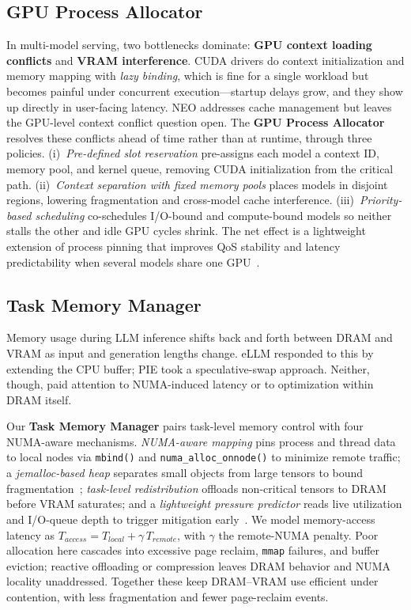 \subsection{GPU Process Allocator}
In multi-model serving, two bottlenecks dominate: \textbf{GPU context loading conflicts} and \textbf{VRAM interference}. CUDA drivers do context initialization and memory mapping with \textit{lazy binding}, which is fine for a single workload but becomes painful under concurrent execution---startup delays grow, and they show up directly in user-facing latency. NEO \cite{jiang2024neo} addresses cache management but leaves the GPU-level context conflict question open.
The \textbf{GPU Process Allocator} resolves these conflicts ahead of time rather than at runtime, through three policies. (i)~\emph{Pre-defined slot reservation} pre-assigns each model a context ID, memory pool, and kernel queue, removing CUDA initialization from the critical path. (ii)~\emph{Context separation with fixed memory pools} places models in disjoint regions, lowering fragmentation and cross-model cache interference. (iii)~\emph{Priority-based scheduling} co-schedules I/O-bound and compute-bound models so neither stalls the other and idle GPU cycles shrink. The net effect is a lightweight extension of process pinning that improves QoS stability and latency predictability when several models share one GPU~\cite{stojkovic2025dynamollm}.



\subsection{Task Memory Manager}
Memory usage during LLM inference shifts back and forth between DRAM and VRAM as input and generation lengths change. eLLM \cite{xu2025ellm} responded to this by extending the CPU buffer; PIE \cite{xu2024pie} took a speculative-swap approach. Neither, though, paid attention to NUMA-induced latency or to optimization within DRAM itself.

Our \textbf{Task Memory Manager} pairs task-level memory control with four NUMA-aware mechanisms. \emph{NUMA-aware mapping} pins process and thread data to local nodes via \texttt{mbind()} and \texttt{numa\_alloc\_onnode()} to minimize remote traffic; a \emph{jemalloc-based heap} separates small objects from large tensors to bound fragmentation~\cite{hunter2021hugepage,yang2023numalloc}; \emph{task-level redistribution} offloads non-critical tensors to DRAM before VRAM saturates; and a \emph{lightweight pressure predictor} reads live utilization and I/O-queue depth to trigger mitigation early~\cite{korthikanti2023reducing}. We model memory-access latency as $T_{access}=T_{local}+\gamma\,T_{remote}$, with $\gamma$ the remote-NUMA penalty. Poor allocation here cascades into excessive page reclaim, \texttt{mmap} failures, and buffer eviction; reactive offloading or compression leaves DRAM behavior and NUMA locality unaddressed. Together these keep DRAM--VRAM use efficient under contention, with less fragmentation and fewer page-reclaim events.



